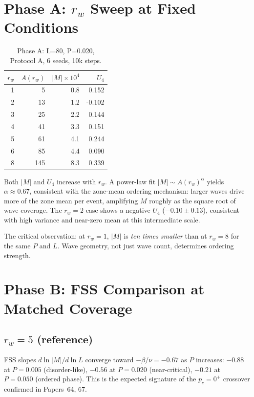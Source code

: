 \documentclass[twocolumn,10pt]{article}
\begin{document}
\section{Phase A: $r_w$ Sweep at Fixed Conditions}

\begin{table}[h]
\centering
\caption{Phase A: L=80, P=0.020, Protocol A, 6 seeds, 10k steps.}
\label{tab:phaseA}
\begin{tabular}{rrrr}
\toprule
$r_w$ & $A(r_w)$ & $|M|\times10^4$ & $U_4$ \\
\midrule
1 & 5   & 0.8 & 0.152 \\
2 & 13  & 1.2 & -0.102 \\
3 & 25  & 2.2 & 0.144 \\
4 & 41  & 3.3 & 0.151 \\
5 & 61  & 4.1 & 0.244 \\
6 & 85  & 4.4 & 0.090 \\
8 & 145 & 8.3 & 0.339 \\
\bottomrule
\end{tabular}
\end{table}

Both $|M|$ and $U_4$ increase with $r_w$.
A power-law fit $|M|\sim A(r_w)^\alpha$ yields $\alpha\approx0.67$, consistent
with the zone-mean ordering mechanism: larger waves drive more of the zone
mean per event, amplifying $M$ roughly as the square root of wave coverage.
The $r_w=2$ case shows a negative $U_4$ ($-0.10\pm0.13$), consistent with
high variance and near-zero mean at this intermediate scale.

The critical observation: at $r_w=1$, $|M|$ is \emph{ten times smaller}
than at $r_w=8$ for the same $P$ and $L$.
Wave geometry, not just wave count, determines ordering strength.

\section{Phase B: FSS Comparison at Matched Coverage}

\subsection{$r_w = 5$ (reference)}

FSS slopes $d\ln|M|/d\ln L$ converge toward $-\beta/\nu=-0.67$ as $P$ increases:
$-0.88$ at $P=0.005$ (disorder-like), $-0.56$ at $P=0.020$ (near-critical),
$-0.21$ at $P=0.050$ (ordered phase).
This is the expected signature of the $p_c=0^+$ crossover confirmed in Papers~64, 67.
\end{document}
